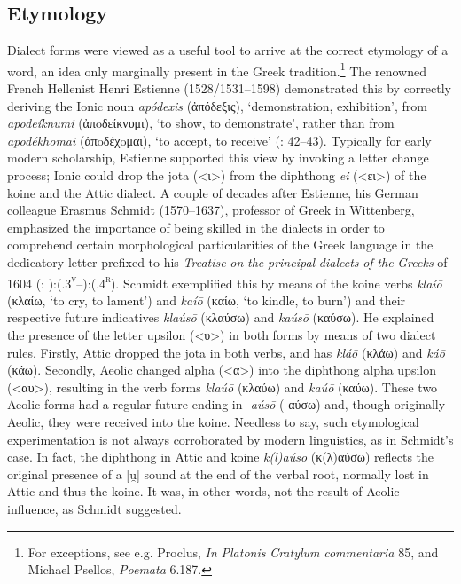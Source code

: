 \subsection{Etymology}

Dialect forms were viewed as a useful tool to arrive at the correct etymology of a word, an idea only marginally present in the Greek tradition.\footnote{For exceptions, see e.g. Proclus, \textit{In} \textit{Platonis} \textit{Cratylum} \textit{commentaria} 85, and Michael Psellos, \textit{Poemata} 6.187.} The renowned French Hellenist Henri Estienne (1528/1531–1598) demonstrated this by correctly deriving the Ionic noun \textit{apódexis} (ἀπόδεξις), ‘demonstration, exhibition’, from \textit{apodeíknumi} (ἀπoδείκνυμι), ‘to show, to demonstrate’, rather than from \textit{apodékhomai} (ἀπoδέχoμαι), ‘to accept, to receive’ (\citealt{Estienne1581}: 42–43). Typically for early modern scholarship, Estienne supported this view by invoking a letter change process; Ionic could drop the jota (<ι>) from the diphthong \textit{ei} (<ει>) of the koine and the Attic dialect. A couple of decades after Estienne, his German colleague Erasmus Schmidt (1570–1637), professor of Greek in Wittenberg, emphasized the importance of being skilled in the dialects in order to comprehend certain morphological particularities of the Greek language in the dedicatory letter prefixed to his \textit{Treatise} \textit{on} \textit{the} \textit{principal} \textit{dialects} \textit{of} \textit{the} \textit{Greeks} of 1604 (\citealt{Schmidt1604}: ):(.3\textsc{\textsuperscript{v}}–):(.4\textsc{\textsuperscript{r}}). Schmidt exemplified this by means of the koine verbs \textit{klaíō} (κλαίω, ‘to cry, to lament’) and \textit{kaíō} (καίω, ‘to kindle, to burn’) and their respective future indicatives \textit{klaúsō} (κλαύσω) and \textit{kaúsō} (καύσω). He explained the presence of the letter upsilon (<υ>) in both forms by means of two dialect rules. Firstly, Attic dropped the jota in both verbs, and has \textit{kláō} (κλάω) and \textit{káō} (κάω). Secondly, Aeolic changed alpha (<α>) into the diphthong alpha upsilon (<αυ>), resulting in the verb forms \textit{klaúō} (κλαύω) and \textit{kaúō} (καύω). These two Aeolic forms had a regular future ending in -\textit{aúsō} (-αύσω) and, though originally Aeolic, they were received into the koine. Needless to say, such etymological experimentation is not always corroborated by modern linguistics, as in Schmidt’s case.{} In fact, the diphthong in Attic and koine \textit{k(l)aúsō} (κ(λ)αύσω) reflects the original presence of a [u̯] sound at the end of the verbal root, normally lost in Attic and thus the koine. It was, in other words, not the result of Aeolic influence, as Schmidt suggested.

